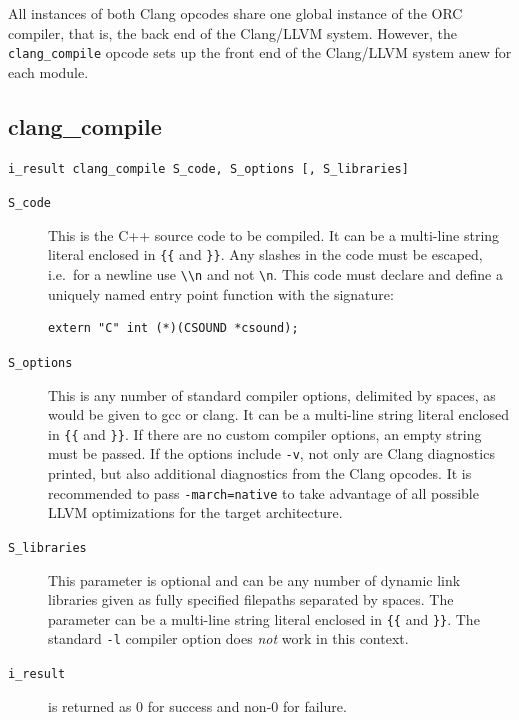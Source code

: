\documentclass[letterpaper, 12pt]{article}
\begin{document}
All instances of both Clang opcodes share one global instance of the ORC compiler, that is, the back end of the Clang/LLVM system. However, the \verb|clang_compile| opcode sets up the front end of the Clang/LLVM system anew for each module.

\subsection{clang\_compile}

\begin{Verbatim}[fontfamily=courier, xleftmargin=\parindent]
i_result clang_compile S_code, S_options [, S_libraries]
\end{Verbatim}

\begin{description}
\item[\texttt{S\_code}] This is the C++ source code to be compiled. It can be a multi-line string literal enclosed in \verb|{{| and \verb|}}|. Any slashes in the code must be escaped, i.e.\ for a newline use \verb|\\n| and not \verb|\n|. This code must declare and define a 
uniquely named entry point function with the signature:

\begin{Verbatim}[fontfamily=courier, xleftmargin=\parindent]
extern "C" int (*)(CSOUND *csound);
\end{Verbatim}

\item[\texttt{S\_options}] This is any number of standard compiler options, delimited by spaces, as would be given to gcc or clang. It can be a multi-line string literal enclosed in \verb|{{| and \verb|}}|. If there are no custom compiler options, an empty string must be passed. If the options include \verb|-v|, not only are Clang diagnostics printed, but also additional diagnostics from the Clang opcodes. It is recommended to pass \verb|-march=native| to take advantage of all possible LLVM optimizations for the target architecture.
\item[\texttt{S\_libraries}] This parameter is optional and can be any number of dynamic link libraries given as fully specified filepaths separated by spaces. The parameter can be a multi-line string literal enclosed in \verb|{{| and \verb|}}|. The standard \texttt{-l} compiler option does \textit{not} work in this context.
\item[\texttt{i\_result}] is returned as 0 for success and non-0 for failure. 
\end{description}
\end{document}
